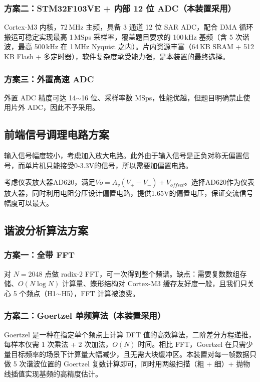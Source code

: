 \documentclass[a4paper]{article}
\begin{document}
	\subsubsection{方案二：STM32F103VE + 内部 12 位 ADC（本装置采用）}
	Cortex-M3 内核，72\,MHz 主频，具备 3 通道 12 位 SAR ADC，配合 DMA 循环搬运可稳定实现最高 1\,MSps 采样率，覆盖题目要求的 100\,kHz 基频（含 5 次谐波，最高 500\,kHz 在 1\,MHz Nyquist 之内）。片内资源丰富（64\,KB SRAM + 512\,KB Flash + 多定时器），软件复杂度承受能力强，是本装置的最终选择。

	\subsubsection{方案三：外置高速 ADC}
	外置 ADC 精度可达 14$\sim$16 位、采样率数 MSps，性能优越，但题目明确禁止使用片外 ADC，因此不予采用。

	\subsection{前端信号调理电路方案}

	输入信号幅度较小，考虑加入放大电路。此外由于输入信号是正负对称无偏置信号，而单片机只能接受0-3.3V的信号，所以需要加偏置电路。

	考虑仪表放大器AD620，满足$Vo = A_v(V_+ - V_-) + V_{offset}$。选择AD620作为仪表放大器，同时利用电阻分压设计偏置电路，提供1.65V的偏置电压，保证交流信号幅度可以最大。

	\subsection{谐波分析算法方案}

	\subsubsection{方案一：全带 FFT}
	对 $N = 2048$ 点做 radix-2 FFT，可一次得到整个频谱。缺点：需要复数数组存储、$O(N \log N)$ 计算量、蝶形结构对 Cortex-M3 缓存友好度一般，且我们只关心 5 个频点（H1$\sim$H5），FFT 计算被浪费。

	\subsubsection{方案二：Goertzel 单频算法（本装置采用）}
	Goertzel 是一种在指定单个频点上计算 DFT 值的高效算法，二阶差分方程递推，每样本仅需 1 次乘法 + 2 次加法，$O(N)$ 时间。相比 FFT，Goertzel 在只需少量目标频率的场景下计算量大幅减少，且无需大块缓冲区。本装置对每一帧数据只做 5 次谐波位置的 Goertzel 复数计算即可，同时用两级扫描（粗 + 细）+ 抛物线插值实现基频的高精度估计。
\end{document}

